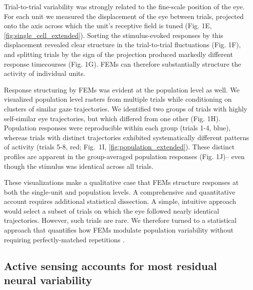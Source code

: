 \documentclass{lite}
\begin{document}
Trial-to-trial variability was strongly related to the fine-scale position of the eye. For each unit we measured the displacement of the eye between trials, projected onto the axis across which the unit's receptive field is tuned (Fig. 1E, \ref{fig:single_cell_extended}). Sorting the stimulus-evoked responses by this displacement revealed clear structure in the trial-to-trial fluctuations (Fig. 1F), and splitting trials by the sign of the projection produced markedly different response timecourses (Fig. 1G). FEMs can therefore substantially structure the activity of individual units.

Response structuring by FEMs was evident at the population level as well. We visualized population level rasters from multiple trials while conditioning on clusters of similar gaze trajectories. We identified two groups of trials with highly self-similar eye trajectories, but which differed from one other (Fig. 1H). Population responses were reproducible within each group (trials 1-4, blue), whereas trials with distinct trajectories exhibited systematically different patterns of activity (trials 5-8, red; Fig.~1I, \ref{fig:population_extended}). These distinct profiles are apparent in the group-averaged population responses (Fig. 1J)-- even though the stimulus was identical across all trials. 

These visualizations make a qualitative case that FEMs structure responses at both the single-unit and population levels. A comprehensive and quantitative account requires additional statistical dissection. A simple, intuitive approach would select a subset of trials on which the eye followed nearly identical trajectories. However, such trials are rare.
We therefore turned to a statistical approach that quantifies how FEMs modulate population variability without requiring perfectly-matched repetitions \cite{mcfarland2016variability}.



\subsection{Active sensing accounts for most residual neural variability}
\end{document}
